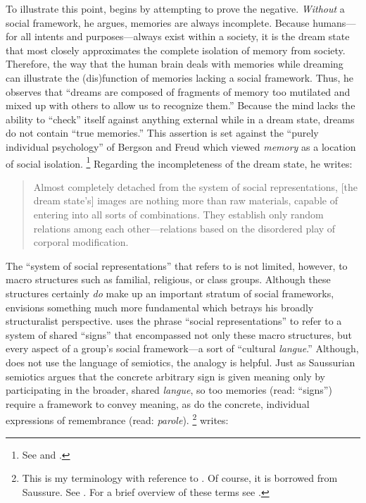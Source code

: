 To illustrate this point, \halbwachs begins  by attempting to prove the negative. \emph{Without} a social framework, he argues, memories are always incomplete. Because humans---for all intents and purposes---always exist within a society, it is the dream state that most closely approximates the complete isolation of memory from society.\autocite[41--42]{halbwachs1992} Therefore, the way that the human brain deals with memories while dreaming can illustrate the (dis)function of memories lacking a social framework. Thus, he observes that ``dreams are composed of fragments of memory too mutilated and mixed up with others to allow us to recognize them.''\autocite[41]{halbwachs1992} Because the mind lacks the ability to ``check'' itself against anything external while in a dream state, dreams do not contain ``true memories.''\autocite[41]{halbwachs1992} This assertion is set against the ``purely individual psychology'' of Bergson and Freud which viewed \emph{memory} as a location of social isolation.%
%
\footnote{See \cite{ansellpearson_radstone-schwarz2011} and \cite{terdiman_radstone-schwarz2011}.}
%
Regarding the incompleteness of the dream state, he writes:  

\begin{quote}
    Almost completely detached from the system of social representations, {[}the dream state's{]} images are nothing more than raw materials, capable of entering into all sorts of combinations. They establish only random relations among each other---relations based on the disordered play of corporal modification.\autocite[42]{halbwachs1992}
\end{quote}  

The ``system of social representations'' that \halbwachs refers to is not limited, however, to macro structures such as familial, religious, or class groups. Although these structures certainly \emph{do} make up an important stratum of social frameworks, \halbwachs envisions something much more fundamental which betrays his broadly structuralist perspective. \halbwachs uses the phrase ``social representations'' to refer to a system of shared ``signs'' that encompassed not only these macro structures, but every aspect of a group's social framework---a sort of ``cultural \emph{langue}.'' Although, \halbwachs does not use the language of semiotics, the analogy is helpful. Just as Saussurian semiotics argues that the concrete arbitrary sign is given meaning only by participating in the broader, shared \emph{langue}, so too memories (read: ``signs'') require a framework to convey meaning, as do the concrete, individual expressions of remembrance (read: \emph{parole}).%
%
\footnote{This is my terminology with reference to \halbwachs. Of course, it is borrowed from Saussure. See \cite*{saussure1916}. For a brief overview of these terms see \cite[93--94]{smith-riley2009}.}
%
\halbwachs writes:  

